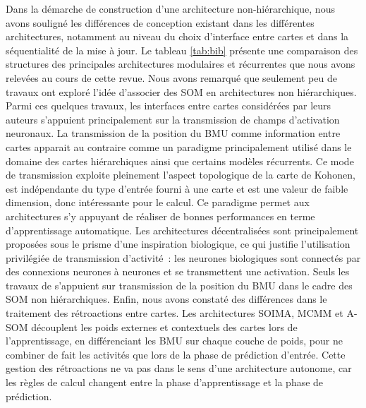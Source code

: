 \documentclass[../main]{subfiles}
\begin{document}
Dans la démarche de construction d'une architecture non-hiérarchique, nous avons souligné les différences de conception existant dans les différentes architectures, notamment au niveau du choix d'interface entre cartes et dans la séquentialité de la mise à jour.
Le tableau \ref{tab:bib} présente une comparaison des structures des principales architectures modulaires et récurrentes que nous avons relevées au cours de cette revue.
Nous avons remarqué que seulement peu de travaux ont exploré l'idée d'associer des SOM en architectures non hiérarchiques. Parmi ces quelques travaux, les interfaces entre cartes considérées par leurs auteurs s'appuient principalement sur la transmission de champs d'activation neuronaux.
La transmission de la position du BMU comme information entre cartes apparait au contraire comme un paradigme principalement utilisé dans le domaine des cartes hiérarchiques ainsi que certains modèles récurrents.
Ce mode de transmission exploite pleinement l'aspect topologique de la carte de Kohonen, est indépendante du type d'entrée fourni à une carte et est une valeur de faible dimension, donc intéressante pour le calcul. Ce paradigme permet aux architectures s'y appuyant de réaliser de bonnes performances en terme d'apprentissage automatique.
Les architectures décentralisées sont principalement proposées sous le prisme d'une inspiration biologique, ce qui justifie l'utilisation privilégiée de transmission d'activité~: les neurones biologiques sont connectés par des connexions neurones à neurones et se transmettent une activation. 
Seuls les travaux de \cite{dominey13} s'appuient sur transmission de la position du BMU dans le cadre des SOM non hiérarchiques.
Enfin, nous avons constaté des différences dans le traitement des rétroactions entre cartes. Les architectures SOIMA, MCMM et A-SOM découplent les poids externes et contextuels des cartes lors de l'apprentissage, en différenciant les BMU sur chaque couche de poids, pour ne combiner de fait les activités que lors de la phase de prédiction d'entrée. 
Cette gestion des rétroactions ne va pas dans le sens d'une architecture autonome, car les règles de calcul changent entre la phase d'apprentissage et la phase de prédiction.
\end{document}
